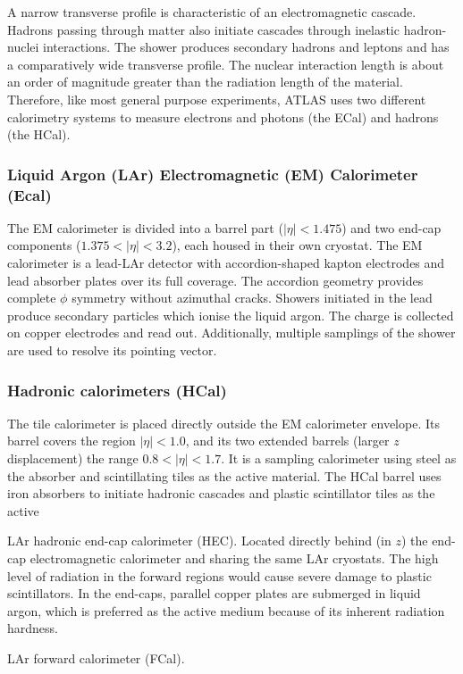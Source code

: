 A narrow transverse profile is characteristic of an electromagnetic cascade. Hadrons passing through matter also initiate cascades through inelastic hadron-nuclei interactions. The shower produces secondary hadrons and leptons and has a comparatively wide transverse profile. The nuclear interaction length is about an order of magnitude greater than the radiation length of the material. Therefore, like most general purpose experiments, ATLAS uses two different calorimetry systems to measure electrons and photons (the ECal) and hadrons (the HCal). 

\subsubsection{Liquid Argon (LAr) Electromagnetic (EM) Calorimeter (Ecal)}
The EM calorimeter is divided into a barrel part ($|\eta| < 1.475$) and two end-cap components ($1.375 < |\eta| < 3.2$), each housed in their own cryostat. The EM calorimeter is a lead-LAr detector with accordion-shaped kapton electrodes and lead absorber plates over its full coverage. The accordion geometry provides complete $\phi$ symmetry without azimuthal cracks. Showers initiated in the lead produce secondary particles which ionise the liquid argon. The charge is collected on copper electrodes and read out. Additionally, multiple samplings of the shower are used to resolve its pointing vector.

\subsubsection{Hadronic calorimeters (HCal)}
The tile calorimeter is placed directly outside the EM calorimeter envelope. Its barrel covers the region $|\eta| < 1.0$, and its two extended barrels (larger $z$ displacement) the range $0.8 < |\eta| < 1.7$. It is a sampling calorimeter using steel as the absorber and scintillating tiles as the active material. The HCal barrel uses iron absorbers to initiate hadronic cascades and plastic scintillator tiles as the active

LAr hadronic end-cap calorimeter (HEC). Located directly behind (in $z$) the end-cap electromagnetic calorimeter and sharing the same LAr cryostats. The high level of radiation in the forward regions would cause severe damage to plastic scintillators. In the end-caps, parallel copper plates are submerged in liquid argon, which is preferred as the active medium because of its inherent radiation hardness.

LAr forward calorimeter (FCal).


